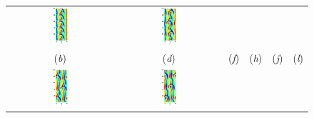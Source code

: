 \begin{figure}[t]
\begin{center}
\begin{tabular}{cccccc}
\includegraphics[width=0.15\textwidth]{figs/ks22rpo020.5-00.00.eps}\hspace{-3ex} &
\includegraphics[width=0.15\textwidth]{figs/ks22rpo066.8-00.00.eps}\\
(\textit{b}) & (\textit{d}) & (\textit{f}) & 
(\textit{h}) & (\textit{j}) & (\textit{l})\\
\includegraphics[width=0.15\textwidth]{figs/ks22rpo032.8-10.96.eps}\hspace{-3ex} &
\includegraphics[width=0.15\textwidth]{figs/ks22rpo034.6-09.60.eps}\hspace{-3ex} &

\end{tabular}
\end{center}
\end{figure}
